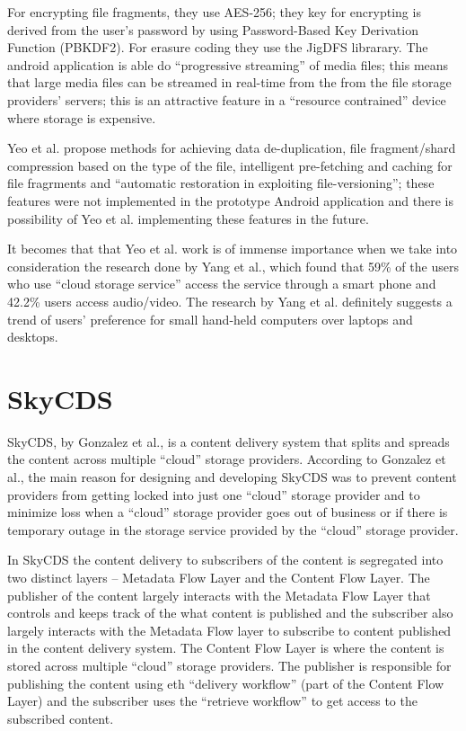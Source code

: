 For encrypting file fragments, they use AES-256; they key for
encrypting is derived from the user's password by using Password-Based
Key Derivation Function (PBKDF2)\cite{kaliski}. For erasure coding
they use the JigDFS librarary\cite{jigdfs}. The android application is
able do ``progressive streaming'' of media files; this means that
large media files can be streamed in real-time from the from the file
storage providers' servers; this is an attractive feature in a
``resource contrained'' device where storage is expensive.

Yeo et al. propose methods for achieving data de-duplication, file
fragment/shard compression based on the type of the file, intelligent
pre-fetching and caching for file fragrments and ``automatic
restoration in exploiting file-versioning''; these features were not
implemented in the prototype Android application and there is
possibility of Yeo et al. implementing these features in the future.

It becomes that that Yeo et al. work is of immense importance when we
take into consideration the research done by Yang et al., which found
that 59\% of the users who use ``cloud storage service'' access the
service through a smart phone and 42.2\% users access
audio/video\cite{yang}. The research by Yang et al. definitely
suggests a trend of users' preference for small hand-held computers
over laptops and desktops.

\section{SkyCDS}\label{3-skycds-sec}

SkyCDS, by Gonzalez et al., is a content delivery system that splits
and spreads the content across multiple ``cloud'' storage
providers\cite{skycds}. According to Gonzalez et al., the main reason
for designing and developing SkyCDS was to prevent content providers
from getting locked into just one ``cloud'' storage provider and to
minimize loss when a ``cloud'' storage provider goes out of business
or if there is temporary outage in the storage service provided by the
``cloud'' storage provider.

In SkyCDS the content delivery to subscribers of the content is
segregated into two distinct layers -- Metadata Flow Layer and the
Content Flow Layer. The publisher of the content largely interacts
with the Metadata Flow Layer that controls and keeps track of the what
content is published and the subscriber also largely interacts with
the Metadata Flow layer to subscribe to content published in the
content delivery system. The Content Flow Layer is where the content
is stored across multiple ``cloud'' storage providers. The publisher
is responsible for publishing the content using eth ``delivery
workflow'' (part of the Content Flow Layer) and the subscriber uses
the ``retrieve workflow'' to get access to the subscribed content.

